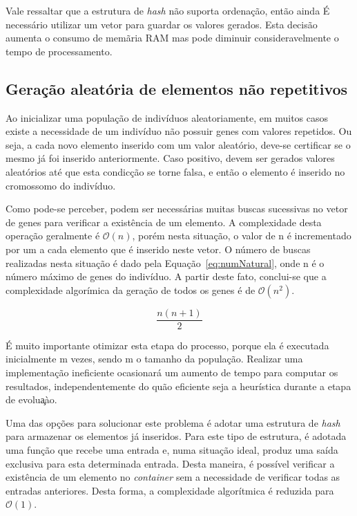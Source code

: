 \documentclass[12pt]{article}
\begin{document}
Vale ressaltar que a estrutura de \textit{hash} n\~{a}o suporta ordena\c{c}\~{a}o, ent\~{a}o
ainda \'{E} necess\'{a}rio utilizar um vetor para guardar os valores gerados. Esta decis\~{a}o
aumenta o consumo de mem\~{a}ria RAM mas pode diminuir consideravelmente o tempo de processamento.

\subsection{Gera\c{c}\~{a}o aleat\'{o}ria de elementos n\~{a}o repetitivos}\label{sec:nonRepeating}

Ao inicializar uma popula\c{c}\~{a}o de indiv\'{i}duos aleatoriamente, em muitos casos existe
a necessidade de um indiv\'{i}duo n\~{a}o possuir genes com valores repetidos. Ou seja, a cada novo
elemento inserido com um valor aleat\'{o}rio, deve-se certificar se o mesmo j\'{a} foi inserido
anteriormente. Caso positivo, devem ser gerados valores aleat\'{o}rios at\'{e} que esta
condic\c{c}\~{a}o se torne falsa, e ent\~{a}o o elemento \'{e} inserido no cromossomo do indiv\'{i}duo.

Como pode-se perceber, podem ser necess\'{a}rias muitas buscas sucessivas no vetor de genes para verificar
a exist\^{e}ncia de um elemento. A complexidade desta opera\c{c}\~{a}o geralmente \'{e} $\mathcal{O}(n)$,
por\'{e}m nesta situa\c{c}\~{a}o, o valor de n \'{e} incrementado por um a cada elemento que \'{e} inserido
neste vetor. O n\'{u}mero de buscas realizadas nesta situa\c{c}\~{a}o \'{e} dado pela
Equa\c{c}\~{a}o~\ref{eq:numNatural}, onde n \'{e} o n\'{u}mero m\'{a}ximo de genes do indiv\'{i}duo. A partir
deste fato, conclui-se que a complexidade algor\'{i}mica da gera\c{c}\~{a}o de todos os genes \'{e} de
$\mathcal{O}(n^2)$.

\begin{equation}
    \frac{n(n+1)}{2}
    \label{eq:numNatural}
\end{equation}

\'{E} muito importante otimizar esta etapa do processo, porque ela \'{e} executada inicialmente m vezes, sendo
m o tamanho da popula\c{c}\~{a}o. Realizar uma implementa\c{c}\~{a}o ineficiente ocasionar\'{a} um aumento de
tempo para computar os resultados, independentemente do qu\~{a}o eficiente seja a heur\'{i}stica durante a etapa
de evolu\c{a}\`{a}o.

Uma das op\c{c}\~{o}es para solucionar este problema \'{e} adotar uma estrutura de \textit{hash} para armazenar os
elementos j\'{a} inseridos. Para este tipo de estrutura, \'{e} adotada uma fun\c{c}\~{a}o que recebe uma entrada e,
numa situa\c{c}\~{a}o ideal, produz uma sa\'{i}da exclusiva para esta determinada entrada. Desta maneira, \'{e}
poss\'{i}vel verificar a exist\^{e}ncia de um elemento no \textit{container} sem a necessidade de verificar todas
as entradas anteriores. Desta forma, a complexidade algor\'{i}tmica \'{e} reduzida para $\mathcal{O}(1)$.
\end{document}
